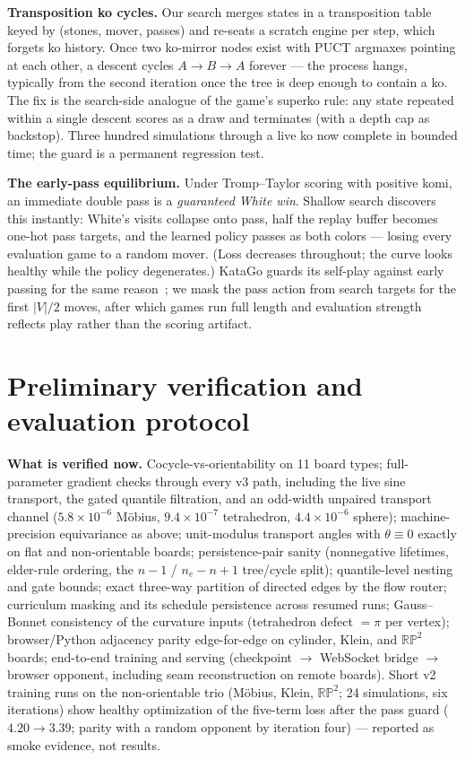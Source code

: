 \documentclass[11pt]{article}
\newcommand{\RP}{\mathbb{RP}}
\begin{document}
\textbf{Transposition ko cycles.} Our search merges states in a
transposition table keyed by (stones, mover, passes) and re-seats a
scratch engine per step, which forgets ko history. Once two ko-mirror
nodes exist with PUCT argmaxes pointing at each other, a descent cycles
$A\to B\to A$ forever --- the process hangs, typically from the second
iteration once the tree is deep enough to contain a ko. The fix is the
search-side analogue of the game's superko rule: any state repeated
within a single descent scores as a draw and terminates (with a depth cap
as backstop). Three hundred simulations through a live ko now complete in
bounded time; the guard is a permanent regression test.

\textbf{The early-pass equilibrium.} Under Tromp--Taylor scoring with
positive komi, an immediate double pass is a \emph{guaranteed White win}.
Shallow search discovers this instantly: White's visits collapse onto
pass, half the replay buffer becomes one-hot pass targets, and the
learned policy passes as both colors --- losing every evaluation game to
a random mover. (Loss decreases throughout; the curve looks healthy while
the policy degenerates.) KataGo guards its self-play against early
passing for the same reason~\cite{wu2019katago}; we mask the pass action
from search targets for the first $|V|/2$ moves, after which games run
full length and evaluation strength reflects play rather than the scoring
artifact.

\section{Preliminary verification and evaluation protocol}
\textbf{What is verified now.} Cocycle-vs-orientability on 11 board
types; full-parameter gradient checks through every v3 path, including
the live sine transport, the gated quantile filtration, and an
odd-width unpaired transport channel ($5.8\times10^{-6}$ M\"obius,
$9.4\times10^{-7}$ tetrahedron, $4.4\times10^{-6}$ sphere);
machine-precision equivariance as above; unit-modulus transport angles
with $\theta \equiv 0$ exactly on flat and non-orientable boards;
persistence-pair sanity (nonnegative lifetimes, elder-rule ordering, the
$n{-}1$ / $n_e{-}n{+}1$ tree/cycle split); quantile-level nesting and
gate bounds; exact three-way partition of directed edges by the flow
router; curriculum masking and its schedule persistence across resumed
runs;
Gauss--Bonnet consistency of the curvature inputs (tetrahedron defect
$=\pi$ per vertex); browser/Python adjacency parity edge-for-edge on
cylinder, Klein, and $\RP^2$ boards; end-to-end training and serving
(checkpoint $\to$ WebSocket bridge $\to$ browser opponent, including seam
reconstruction on remote boards). Short v2 training runs on the non-orientable trio (M\"obius, Klein,
$\RP^2$; 24 simulations, six iterations) show healthy optimization of
the five-term loss after the pass guard ($4.20\!\to\!3.39$; parity with
a random opponent by iteration four) --- reported as smoke evidence, not
results.
\end{document}
